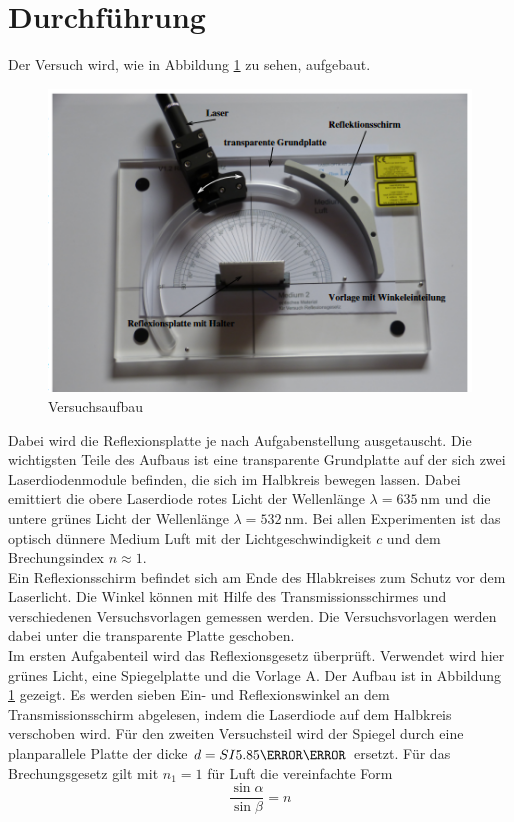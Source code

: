 \section{Durchführung}
\label{sec:Durchführung}
Der Versuch wird, wie in Abbildung \ref{fig:aufb} zu sehen, aufgebaut.
\begin{figure}
    \centering
    \caption{Versuchsaufbau \cite{V400}}
    \label{fig:aufb}
    \includegraphics[width = 0.6 \textwidth]{pics/aufb.png}
\end{figure}
Dabei wird die Reflexionsplatte je nach Aufgabenstellung ausgetauscht.
Die wichtigsten Teile des Aufbaus ist eine transparente Grundplatte auf der sich zwei Laserdiodenmodule befinden, die sich im Halbkreis bewegen lassen.
Dabei emittiert die obere Laserdiode rotes Licht der Wellenlänge $\lambda = \SI{635}{\nano \meter}$ und die untere grünes Licht der Wellenlänge $\lambda=\SI{532}{\nano \meter}$.
Bei allen Experimenten ist das optisch dünnere Medium Luft mit der Lichtgeschwindigkeit $c$ und dem Brechungsindex $n \approx 1$.\\
Ein Reflexionsschirm befindet sich am Ende des Hlabkreises zum Schutz vor dem Laserlicht. Die Winkel können mit Hilfe des Transmissionsschirmes und verschiedenen Versuchsvorlagen gemessen werden.
Die Versuchsvorlagen werden dabei unter die transparente Platte geschoben.\\
Im ersten Aufgabenteil wird das Reflexionsgesetz überprüft. Verwendet wird hier grünes Licht, eine Spiegelplatte und die Vorlage A.
Der Aufbau ist in Abbildung \ref{fig:aufb} gezeigt. Es werden sieben Ein- und Reflexionswinkel an dem Transmissionsschirm abgelesen, indem die Laserdiode auf dem Halbkreis verschoben wird.
Für den zweiten Versuchsteil wird der Spiegel durch eine planparallele Platte der dicke $d=SI{5.85}{\centi \metre} $ ersetzt. Für das Brechungsgesetz gilt mit $n_1=1$ für Luft die vereinfachte Form
\begin{equation}
    \frac{\sin \alpha}{\sin \beta} = n
\end{equation}
